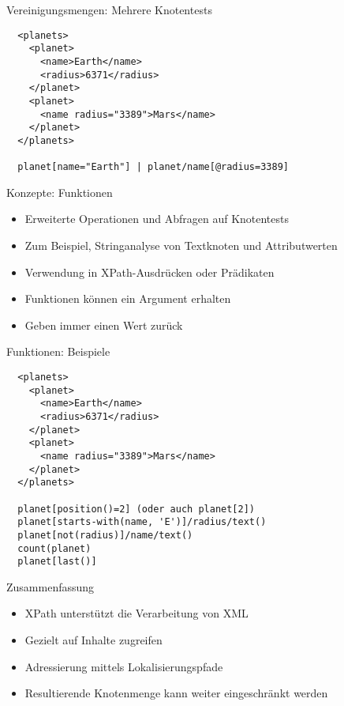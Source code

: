 \documentclass{beamer}
\begin{document}
\begin{frame}[fragile]{Vereinigungsmengen: Mehrere Knotentests}
	
	\lstset{language=XML}
	\begin{lstlisting}
  <planets>
    <planet>
      <name>Earth</name>
      <radius>6371</radius>
    </planet>
    <planet>
      <name radius="3389">Mars</name>
    </planet>
  </planets>
	
  planet[name="Earth"] | planet/name[@radius=3389]
	\end{lstlisting}
	
\end{frame}

\begin{frame}{Konzepte: Funktionen}
	
	\begin{itemize}
		\item Erweiterte Operationen und Abfragen auf Knotentests
		\item Zum Beispiel, Stringanalyse von Textknoten und Attributwerten
		\item Verwendung in XPath-Ausdrücken oder Prädikaten
		\item Funktionen können ein Argument erhalten
		\item Geben immer einen Wert zurück
	\end{itemize}
	
\end{frame}

\begin{frame}[fragile]{Funktionen: Beispiele}
	
	\lstset{language=XML}
	\begin{lstlisting}
  <planets>
    <planet>
      <name>Earth</name>
      <radius>6371</radius>
    </planet>
    <planet>
      <name radius="3389">Mars</name>
    </planet>
  </planets>
	
  planet[position()=2] (oder auch planet[2])
  planet[starts-with(name, 'E')]/radius/text()
  planet[not(radius)]/name/text()
  count(planet)
  planet[last()]
	\end{lstlisting}
	
\end{frame}

\begin{frame}{Zusammenfassung}
	
	\begin{itemize}
		\item XPath unterstützt die Verarbeitung von XML
		\item Gezielt auf Inhalte zugreifen
		\item Adressierung mittels Lokalisierungspfade
		\item Resultierende Knotenmenge kann weiter eingeschränkt werden
	\end{itemize}
	
\end{frame}
\end{document}
